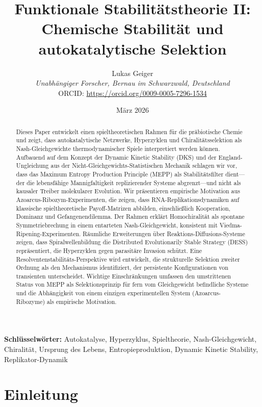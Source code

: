 \documentclass[12pt,a4paper]{article}
\title{Funktionale Stabilit\"atstheorie II: Chemische Stabilit\"at und autokatalytische Selektion}
\author{Lukas Geiger\\
\textit{Unabh\"angiger Forscher, Bernau im Schwarzwald, Deutschland}\\
ORCID: \url{https://orcid.org/0009-0005-7296-1534}}
\date{M\"arz 2026}
\theoremstyle{remark}
\begin{document}
\maketitle

\begin{abstract}
Dieses Paper entwickelt einen spieltheoretischen Rahmen f\"ur die pr\"abiotische Chemie und zeigt, dass autokatalytische Netzwerke, Hyperzyklen und Chiralit\"atsselektion als Nash-Gleichgewichte thermodynamischer Spiele interpretiert werden k\"onnen. Aufbauend auf dem Konzept der Dynamic Kinetic Stability (DKS) und der England-Ungleichung aus der Nicht-Gleichgewichts-Statistischen Mechanik schlagen wir vor, dass das Maximum Entropy Production Principle (MEPP) als Stabilit\"atsfilter dient---der die lebensfähige Mannigfaltigkeit replizierender Systeme abgrenzt---und nicht als kausaler Treiber molekularer Evolution. Wir pr\"asentieren empirische Motivation aus Azoarcus-Ribozym-Experimenten, die zeigen, dass RNA-Replikationsdynamiken auf klassische spieltheoretische Payoff-Matrizen abbilden, einschlie\ss{}lich Kooperation, Dominanz und Gefangenendilemma. Der Rahmen erkl\"art Homochiralit\"at als spontane Symmetriebrechung in einem entarteten Nash-Gleichgewicht, konsistent mit Viedma-Ripening-Experimenten. R\"aumliche Erweiterungen \"uber Reaktions-Diffusions-Systeme zeigen, dass Spiralwellenbildung die Distributed Evolutionarily Stable Strategy (DESS) repr\"asentiert, die Hyperzyklen gegen parasit\"are Invasion sch\"utzt. Eine Resolventenstabilit\"ats-Perspektive wird entwickelt, die strukturelle Selektion zweiter Ordnung als den Mechanismus identifiziert, der persistente Konfigurationen von transienten unterscheidet. Wichtige Einschr\"ankungen umfassen den umstrittenen Status von MEPP als Selektionsprinzip f\"ur fern vom Gleichgewicht befindliche Systeme und die Abh\"angigkeit von einem einzigen experimentellen System (Azoarcus-Ribozyme) als empirische Motivation.
\end{abstract}

\textbf{Schl\"usselw\"orter:} Autokatalyse, Hyperzyklus, Spieltheorie, Nash-Gleichgewicht, Chiralit\"at, Ursprung des Lebens, Entropieproduktion, Dynamic Kinetic Stability, Replikator-Dynamik

\section{Einleitung}
\label{sec:introduction}
\end{document}
